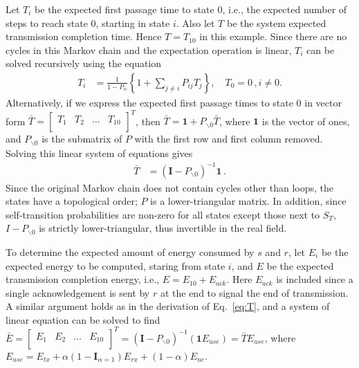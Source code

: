 \documentclass[journal, letterpaper]{IEEEtran}
\begin{document}
Let $T_i$ be the expected first passage time to state 0, i.e., the expected number of steps to reach state 0, starting in state $i$. Also let $T$ be the system expected transmission completion time. Hence $T=T_{10}$ in this example. Since there are no cycles in this Markov chain and the expectation operation is linear, $T_i$ can be solved recursively using the equation
\begin{align*}
T_{i} &= \frac{1}{1-P_{ii}} \left\{ 1 + \sum_{j\neq i} P_{ij} T_{j} \right\}, \quad T_{0} = 0\,, i\neq 0.
\end{align*}
Alternatively, if we express the expected first passage times to state $0$ in vector form $\bar{T} = \left[
                                                                           \begin{array}{cccc}
                                                                             T_1 & T_2 & \ldots & T_{10} \\
                                                                           \end{array}
                                                                         \right]^T
$, then $\bar{T} = \mathbf{1}+P_{\backslash 0}\bar{T}$, where $\mathbf{1}$ is the vector of ones, and  $P_{\backslash 0}$ is the submatrix of $P$ with the first row and first column removed. Solving this linear system of equations gives
\begin{align}
 \bar{T} &= (\mathbf{I} - P_{\backslash 0})^{-1} \mathbf{1}\,.\label{eq:T}
\end{align}
Since the original Markov chain does not contain cycles other than loops, the states have a topological order; $P$ is a lower-triangular matrix. In addition, since self-transition probabilities are non-zero for all states except those next to $S_T$, $I-P_{\backslash 0}$ is strictly lower-triangular, thus invertible in the real field.

To determine the expected amount of energy consumed by $s$ and $r$, let $E_i$ be the expected energy to be computed, staring from state $i$, and $E$ be the expected transmission completion energy, i.e., $E=E_{10}+E_{ack}$. Here $E_{ack}$ is included since a single acknowledgement is sent by $r$ at the end to signal the end of transmission. A similar argument holds as in the derivation of Eq.~\eqref{eq:T}, and a system of linear equation can be solved to find $\bar{E} = \left[
                                                                           \begin{array}{cccc}
                                                                             E_1 & E_2 & \ldots & E_{10} \\
                                                                           \end{array}
                                                                         \right]^T =(\mathbf{I} - P_{\backslash 0})^{-1} (\mathbf{1}E_{use}) = \bar{T}E_{use}
$, where $E_{use}= E_{tx} + \alpha(1-\mathbf{I}_{\alpha=1})E_{rx}+(1-\alpha)E_{nc}$.
\end{document}
